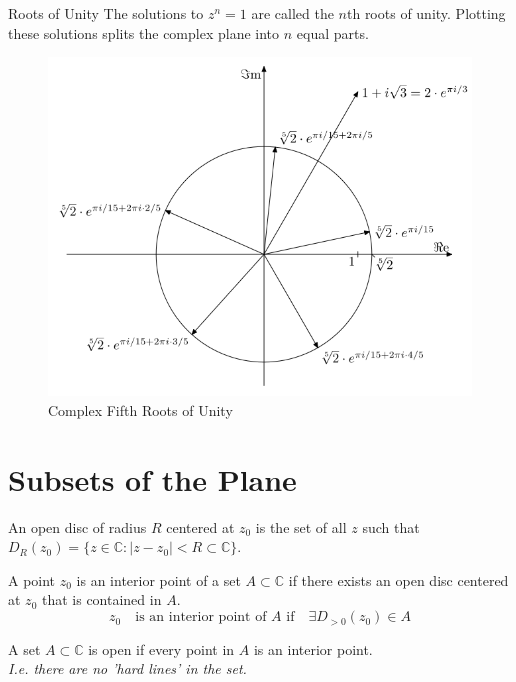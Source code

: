 \begin{remark}
    Roots of Unity
    The solutions to $z^n = 1$ are called the $n$th roots of unity. Plotting these solutions splits the complex plane into $n$ equal parts.
    \begin{figure}
        \centering
        \includegraphics[scale = 0.2]{./LECTURE_1/Complex_fifth_roots.png}
        \caption{Complex Fifth Roots of Unity}
        \label{fig:roots}
    \end{figure}
\end{remark}
\section{Subsets of the Plane}
\begin{definition}
    An open disc of radius $R$ centered at $z_0$ is the set of all $z$ such that $D_R(z_0) = \{z \in \mathbb{C} : |z - z_0| < R \subset \mathbb{C}\}$.
\end{definition}
\begin{definition}
    A point $z_0$ is an interior point of a set $A \subset \mathbb{C}$ if there exists an open disc centered at $z_0$ that is contained in $A$.
    \[z_0 \quad \text{is an interior point of $A$ if} \quad \exists D_{>0}(z_0)\in A\]
\end{definition}

\begin{definition}
    A set $A \subset \mathbb{C}$ is open if every point in $A$ is an interior point. \\
    \textit{I.e. there are no 'hard lines' in the set.}
\end{definition}

